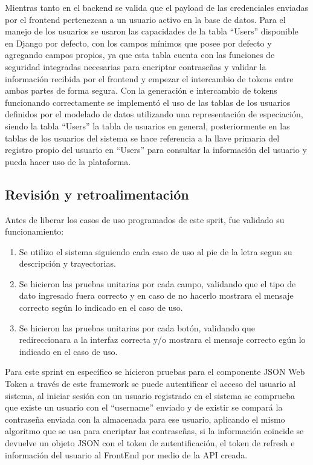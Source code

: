         Mientras tanto en el backend se valida que el payload de las credenciales enviadas por el frontend pertenezcan a un usuario activo en la base de datos. Para el manejo de los usuarios se usaron las capacidades de la tabla “Users” disponible en Django por defecto, con los campos mínimos que posee por defecto y agregando campos propios, ya que esta tabla cuenta con las funciones de seguridad integradas necesarias para encriptar contraseñas y validar la información recibida por el frontend y empezar el intercambio de tokens entre ambas partes de forma segura. Con la generación e intercambio de tokens funcionando correctamente se implementó el uso de las tablas de los usuarios definidos por el modelado de datos utilizando una representación de especiación, siendo la tabla “Users” la tabla de usuarios en general, posteriormente en las tablas de los usuarios del sistema se hace referencia a la llave primaria del registro propio del usuario en “Users” para consultar la información del usuario y pueda hacer uso de la plataforma.

       \subsection{Revisión y retroalimentación}
       Antes de liberar los casos de uso programados de este sprit, fue validado su funcionamiento:
        \begin{enumerate}
            \item Se utilizo el sistema siguiendo cada caso de uso al pie de la letra segun su descripción y trayectorias. 
            \item Se hicieron las pruebas unitarias por cada campo, validando que el tipo de dato ingresado fuera correcto y en caso de no 
            hacerlo mostrara el mensaje correcto según lo indicado en el caso de uso.
            \item Se hicieron las pruebas unitarias por cada botón, validando que redireccionara a la interfaz correcta y/o mostrara el mensaje
            correcto egún lo indicado en el caso de uso.
        \end{enumerate} 
       Para este sprint en específico se hicieron pruebas para el componente JSON Web Token a través de este 
       framework se puede autentificar el acceso del usuario al sistema, al iniciar sesión con un usuario 
       registrado en el sistema se comprueba que existe un usuario con el ``username'' enviado y de existir 
       se compará la contraseña enviada con la almacenada para ese usuario, aplicando el mismo algoritmo que
     se usa para encriptar las contraseñas, si la información coincide se devuelve un objeto JSON con el token de autentificación, el token de refresh e información del usuario al FrontEnd por medio de la API creada.

    


